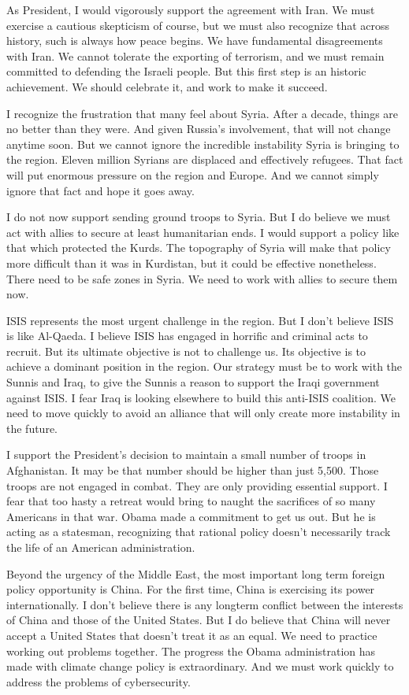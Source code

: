 As President, I would vigorously support the agreement with Iran. We must exercise a cautious skepticism of course, but we must also recognize that across history, such is always how peace begins. We have fundamental disagreements with Iran. We cannot tolerate the exporting of terrorism, and we must remain committed to defending the Israeli people. But this first step is an historic achievement. We should celebrate it, and work to make it succeed.

I recognize the frustration that many feel about Syria. After a decade, things are no better than they were. And given Russia's involvement, that will not change anytime soon. But we cannot ignore the incredible instability Syria is bringing to the region. Eleven million Syrians are displaced and effectively refugees. That fact will put enormous pressure on the region and Europe. And we cannot simply ignore that fact and hope it goes away.

I do not now support sending ground troops to Syria. But I do believe we must act with allies to secure at least humanitarian ends. I would support a policy like that which protected the Kurds. The topography of Syria will make that policy more difficult than it was in Kurdistan, but it could be effective nonetheless. There need to be safe zones in Syria. We need to work with allies to secure them now.

ISIS represents the most urgent challenge in the region. But I don't believe ISIS is like Al-Qaeda. I believe ISIS has engaged in horrific and criminal acts to recruit. But its ultimate objective is not to challenge us. Its objective is to achieve a dominant position in the region. Our strategy must be to work with the Sunnis and Iraq, to give the Sunnis a reason to support the Iraqi government against ISIS. I fear Iraq is looking elsewhere to build this anti-ISIS coalition. We need to move quickly to avoid an alliance that will only create more instability in the future.

I support the President's decision to maintain a small number of troops in Afghanistan. It may be that number should be higher than just 5,500. Those troops are not engaged in combat. They are only providing essential support. I fear that too hasty a retreat would bring to naught the sacrifices of so many Americans in that war. Obama made a commitment to get us out. But he is acting as a statesman, recognizing that rational policy doesn't necessarily track the life of an American administration.

Beyond the urgency of the Middle East, the most important long term foreign policy opportunity is China. For the first time, China is exercising its power internationally. I don't believe there is any longterm conflict between the interests of China and those of the United States. But I do believe that China will never accept a United States that doesn't treat it as an equal. We need to practice working out problems together. The progress the Obama administration has made with climate change policy is extraordinary. And we must work quickly to address the problems of cybersecurity.

